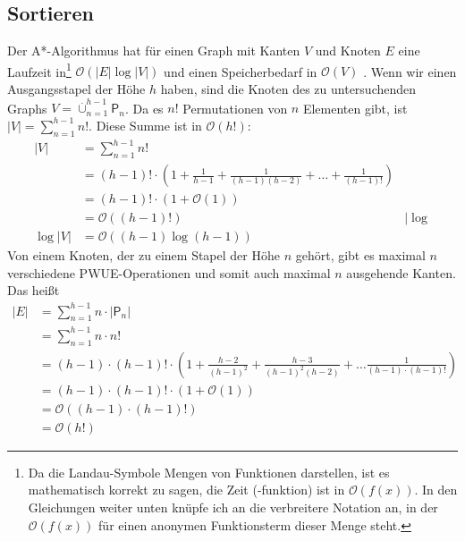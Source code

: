 \documentclass[a4paper,10pt,ngerman]{scrartcl}
\begin{document}
\subsection{Sortieren}
Der A*-Algorithmus hat für einen Graph mit Kanten $V$ und Knoten $E$ eine
Laufzeit in\footnote{Da die Landau-Symbole Mengen von Funktionen darstellen,
ist es mathematisch korrekt zu sagen, die Zeit (-funktion) ist in
$\mathcal{O}(f(x))$. In den Gleichungen weiter unten knüpfe ich an die
verbreitere Notation an, in der $\mathcal{O}(f(x))$ für einen anonymen
  Funktionsterm dieser Menge steht.} $\mathcal{O}(|E| \log |V|)$ und einen
  Speicherbedarf in $\mathcal{O}(V)$ \cite[654]{sedgewick_wayne_2011}. Wenn wir
  einen Ausgangsstapel der Höhe $h$ haben, sind die Knoten des zu untersuchenden
  Graphs $V = \overset{.}\cup_{n=1}^{h-1} \mathsf{P}_n$. Da es $n!$ Permutationen
  von $n$ Elementen gibt, ist $|V| = \sum_{n=1}^{h-1}n!$. Diese Summe ist in
$\mathcal{O}(h!)$:
  \begin{align*}
    |V|      & = \sum_{n=1}^{h-1}n!                                                                           \\
             & = (h-1)! \cdot (1 + \frac{1}{h-1} + \frac{1}{(h-1)(h-2)} + \ldots + \frac{1}{(h-1)!})          \\
             & = (h-1)! \cdot (1 + \mathcal{O}(1))                                                            \\
             & = \mathcal{O}((h-1)!)                                                                 & | \log \\
    \log |V| & = \mathcal{O}((h-1) \log (h-1))
  \end{align*}
  Von einem Knoten, der zu einem Stapel der Höhe $n$ gehört, gibt es maximal $n$ verschiedene PWUE-Operationen und somit auch maximal $n$ ausgehende Kanten. Das heißt
  \begin{align*}
    |E| & = \sum_{n=1}^{h-1} n \cdot |\mathsf{P}_n|                                                                             \\
        & = \sum_{n=1}^{h-1} n \cdot n!                                                                                         \\
        & = (h-1) \cdot (h-1)! \cdot (1 + \frac{h-2}{(h-1)^2} + \frac{h-3}{(h-1)^2(h-2)} + \ldots \frac{1}{(h-1) \cdot (h-1)!}) \\
        & = (h-1) \cdot (h-1)! \cdot (1 + \mathcal{O}(1))                                                                       \\
        & = \mathcal{O}((h-1) \cdot (h-1)!)                                                                                     \\
        & = \mathcal{O}(h!)
  \end{align*}
\end{document}
